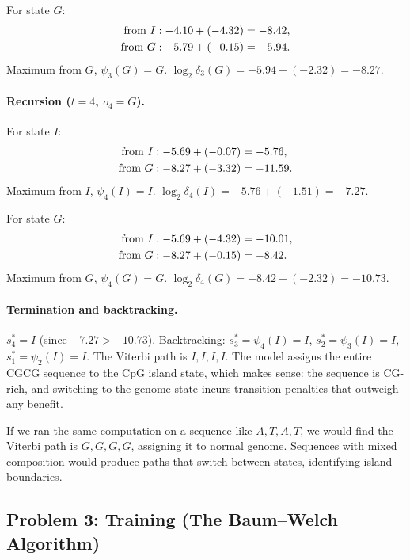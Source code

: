 For state $G$:
\begin{align}
  \text{from } I&: -4.10 + (-4.32) = -8.42, \notag \\
  \text{from } G&: -5.79 + (-0.15) = -5.94. \notag
\end{align}
Maximum from $G$, $\psi_3(G) = G$.
$\log_2 \delta_3(G) = -5.94 + (-2.32) = -8.27$.

\paragraph{Recursion ($t = 4$, $o_4 = G$).}
For state $I$:
\begin{align}
  \text{from } I&: -5.69 + (-0.07) = -5.76, \notag \\
  \text{from } G&: -8.27 + (-3.32) = -11.59. \notag
\end{align}
Maximum from $I$, $\psi_4(I) = I$.
$\log_2 \delta_4(I) = -5.76 + (-1.51) = -7.27$.

For state $G$:
\begin{align}
  \text{from } I&: -5.69 + (-4.32) = -10.01, \notag \\
  \text{from } G&: -8.27 + (-0.15) = -8.42. \notag
\end{align}
Maximum from $G$, $\psi_4(G) = G$.
$\log_2 \delta_4(G) = -8.42 + (-2.32) = -10.73$.

\paragraph{Termination and backtracking.}
$s_4^* = I$ (since $-7.27 > -10.73$).
Backtracking: $s_3^* = \psi_4(I) = I$, $s_2^* = \psi_3(I) = I$, $s_1^* = \psi_2(I) = I$.
The Viterbi path is $I, I, I, I$.
The model assigns the entire CGCG sequence to the CpG island state, which makes sense: the sequence is CG-rich, and switching to the genome state incurs transition penalties that outweigh any benefit.

If we ran the same computation on a sequence like $A, T, A, T$, we would find the Viterbi path is $G, G, G, G$, assigning it to normal genome.
Sequences with mixed composition would produce paths that switch between states, identifying island boundaries.


\subsection{Problem 3: Training (The Baum--Welch Algorithm)}
\label{sec:baum-welch}


